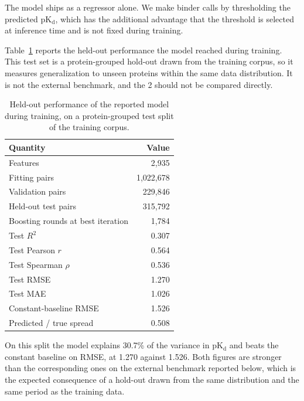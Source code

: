 \documentclass[times, twoside]{zHenriquesLab-StyleBioRxiv}
\newcommand{\pkd}{\ensuremath{\mathrm{pK_d}}\xspace}
\begin{document}
The model ships as a regressor alone. We make binder calls by thresholding the predicted \pkd, which has the additional advantage that the threshold is selected at inference time and is not fixed during training.

Table~\ref{tab:training} reports the held-out performance the model reached during training. This test set is a protein-grouped hold-out drawn from the training corpus, so it measures generalization to unseen proteins within the same data distribution. It is not the external benchmark, and the 2 should not be compared directly.

\begin{table}[h]
\centering
\caption{Held-out performance of the reported model during training, on a protein-grouped test split of the training corpus.}
\label{tab:training}
\small
\begin{tabular}{lr}
\toprule
Quantity & Value \\
\midrule
Features                          & 2,935 \\
Fitting pairs                     & 1,022,678 \\
Validation pairs                  & 229,846 \\
Held-out test pairs               & 315,792 \\
Boosting rounds at best iteration & 1,784 \\
\midrule
Test $R^2$                        & 0.307 \\
Test Pearson $r$                  & 0.564 \\
Test Spearman $\rho$              & 0.536 \\
Test RMSE                         & 1.270 \\
Test MAE                          & 1.026 \\
Constant-baseline RMSE            & 1.526 \\
Predicted / true spread           & 0.508 \\
\bottomrule
\end{tabular}
\end{table}

On this split the model explains 30.7\% of the variance in \pkd and beats the constant baseline on RMSE, at 1.270 against 1.526. Both figures are stronger than the corresponding ones on the external benchmark reported below, which is the expected consequence of a hold-out drawn from the same distribution and the same period as the training data.
\end{document}
